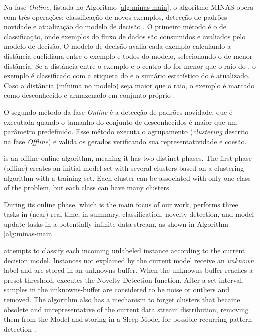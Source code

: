 Na fase \emph{Online}, listada no Algoritmo \ref{alg:minas-main}, o algoritmo MINAS
opera com três operações: classificação de novos exemplos, detecção de 
padrões-novidade e atualização do modelo de decisão \cite{Faria2016minas}.
O primeiro método é o de classificação, onde exemplos do fluxo de dados
são consumidos e avaliados pelo modelo de decisão.
O modelo de decisão avalia cada exemplo calculando a distância euclidiana
entre o exemplo e todos \mclusters do modelo, selecionando o
\mcluster de menor distância.
Se a distância entre o exemplo e o centro do \mcluster for menor que
o raio do \mcluster, o exemplo é classificado com a etiqueta do \mcluster
e o sumário estatístico do \mcluster é atualizado.
Caso a distância (mínima no modelo) seja maior que o raio,
o exemplo é marcado como desconhecido e armazenado
em conjunto próprio \cite{Faria2016minas}.

O segundo método da fase \emph{Online} é a detecção de padrões novidade, que é
executada quando o tamanho do conjunto de desconhecidos é maior que um parâmetro
predefinido.
Esse método executa o agrupamento (\emph{clustering} descrito na fase
\emph{Offline}) e valida os \mclusters gerados verificando sua
representatividade e coesão.


\minas \cite{Faria2016minas} is an offline-online \nd algorithm,
meaning it has two distinct phases. The first phase (offline) creates an initial
model set with several clusters based on a clustering algorithm with a training
set.
Each cluster can be associated with only one class of the problem, but each
class can have many clusters.

During its online phase, which is the main focus of our work, \minas performs
three tasks in (near) real-time,
in summary,
classification, novelty detection, and model update tasks
in a potentially infinite data stream, as shown in Algorithm \ref{alg:minas-main}.

\minas attempts to classify each incoming unlabeled instance according to the
current decision model. Instances not explained by the current model
receive an \textit{unknown} label and are stored in an unknowns-buffer.
When the unknowns-buffer reaches a preset threshold, \minas executes the
Novelty Detection function.
After a set interval, samples in the unknowns-buffer are considered to be
noise or outliers and removed.
The algorithm also has a mechanism to forget clusters that became obsolete and
unrepresentative of the current data stream distribution, removing them from
the Model and storing in a Sleep Model for possible recurring pattern
detection \cite{Faria2016minas}.

